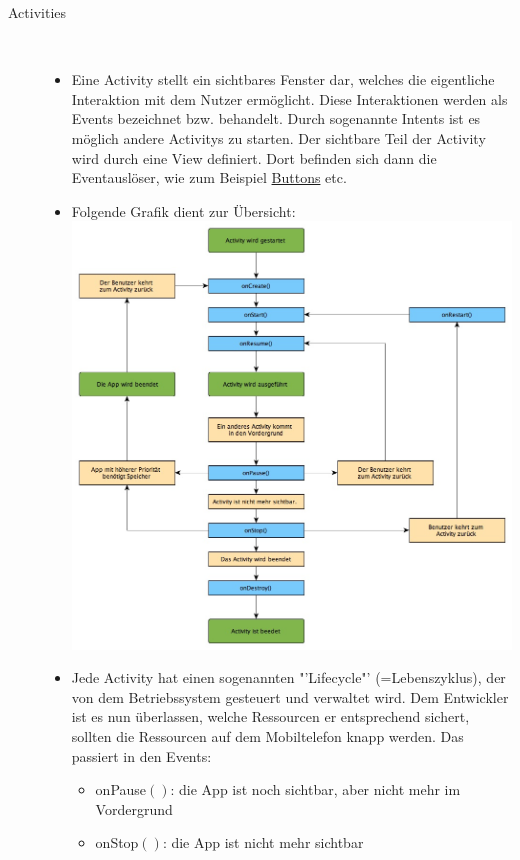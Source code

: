 \begin{description}
\newpage

\item[Activities]~\par
\begin{itemize}
\item Eine Activity stellt ein sichtbares Fenster dar, welches die eigentliche Interaktion mit dem Nutzer ermöglicht. Diese Interaktionen werden als Events bezeichnet bzw. behandelt. Durch sogenannte Intents ist es möglich andere Activitys zu starten. Der sichtbare Teil der Activity wird durch eine View definiert. Dort befinden sich dann die Eventauslöser, wie zum Beispiel \hyperref[button]{Buttons} etc. 
\item Folgende Grafik dient zur Übersicht:\\
\includegraphics[scale=0.5]{05_Handbuch/img/AndroidActivityLebenszyklus.jpg}
\item Jede Activity hat einen sogenannten "'Lifecycle"' (=Lebenszyklus), der von dem Betriebssystem gesteuert und verwaltet wird. Dem Entwickler ist es nun überlassen, welche Ressourcen er entsprechend sichert, sollten die Ressourcen auf dem Mobiltelefon knapp werden. Das passiert in den Events:
\begin{itemize}
\item onPause$()$: die App ist noch sichtbar, aber nicht mehr im Vordergrund
\item onStop$()$: die App ist nicht mehr sichtbar

\end{itemize}
\end{itemize}
\end{description}
